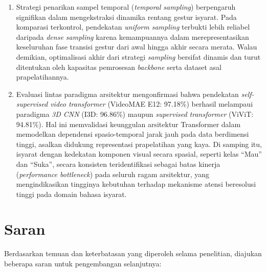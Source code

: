 \begin{enumerate}
  \item Strategi penarikan sampel temporal (\textit{temporal sampling}) berpengaruh signifikan dalam mengekstraksi dinamika rentang gestur isyarat. Pada komparasi terkontrol, pendekatan \textit{uniform sampling} terbukti lebih reliabel daripada \textit{dense sampling} karena kemampuannya dalam merepresentasikan keseluruhan fase transisi gestur dari awal hingga akhir secara merata. Walau demikian, optimalisasi akhir dari strategi \textit{sampling} bersifat dinamis dan turut ditentukan oleh kapasitas pemrosesan \textit{backbone} serta dataset asal prapelatihannya.
  
  \item Evaluasi lintas paradigma arsitektur mengonfirmasi bahwa pendekatan \textit{self-supervised video transformer} (VideoMAE E12: 97.18\%) berhasil melampaui paradigma \textit{3D CNN} (I3D: 96.86\%) maupun \textit{supervised transformer} (ViViT: 94.81\%). Hal ini memvalidasi keunggulan arsitektur Transformer dalam memodelkan dependensi spasio-temporal jarak jauh pada data berdimensi tinggi, asalkan didukung representasi prapelatihan yang kaya. Di samping itu, isyarat dengan kedekatan komponen visual secara spasial, seperti kelas ``Mau'' dan ``Suka'', secara konsisten teridentifikasi sebagai batas kinerja (\textit{performance bottleneck}) pada seluruh ragam arsitektur, yang mengindikasikan tingginya kebutuhan terhadap mekanisme atensi beresolusi tinggi pada domain bahasa isyarat.
\end{enumerate}

\section{Saran} \label{V.Saran}
Berdasarkan temuan dan keterbatasan yang diperoleh selama penelitian, diajukan beberapa saran untuk pengembangan selanjutnya:

